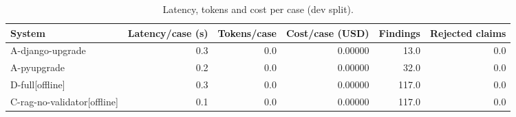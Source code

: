 \begin{table}[t]
\centering
\small
\caption{Latency, tokens and cost per case (dev split).}
\label{tab:cost-dev}
\begin{tabular}{lrrrrr}
\toprule
System & Latency/case (s) & Tokens/case & Cost/case (USD) & Findings & Rejected claims \\
\midrule
A-django-upgrade & 0.3 & 0.0 & 0.00000 & 13.0 & 0.0 \\
A-pyupgrade & 0.2 & 0.0 & 0.00000 & 32.0 & 0.0 \\
D-full[offline] & 0.3 & 0.0 & 0.00000 & 117.0 & 0.0 \\
C-rag-no-validator[offline] & 0.1 & 0.0 & 0.00000 & 117.0 & 0.0 \\
\bottomrule
\end{tabular}
\end{table}
